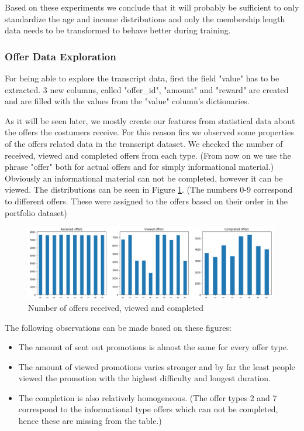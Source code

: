 Based on these experiments we conclude that it will probably be sufficient to only standardize the age and income distributions and only the membership length data needs to be transformed to behave better during training.

\subsubsection{Offer Data Exploration}

For being able to explore the transcript data, first the field "value" has to be extracted. 3 new columns, called "offer\_id", "amount" and "reward" are created and are filled with the values from the "value" column's dictionaries. 

As it will be seen later, we mostly create our features from statistical data about the offers the costumers receive. For this reason firs we observed some properties of the offers related data in the transcript dataset. We checked the number of received, viewed and completed offers from each type. (From now on we use the phrase "offer" both for actual offers and for simply informational material.) Obviously an informational material can not be completed, however it can be viewed. The distributions can be seen in Figure \ref{fig5}. (The numbers 0-9 correspond to different offers. These were assigned to the offers based on their order in the portfolio dataset)

\begin{figure}[h]
	\centering
	\includegraphics[width=0.99\textwidth]{fig/offer_distributions_1.jpg}
	\vspace*{-0.1in}
	\caption{Number of offers received, viewed and completed}
	\label{fig5}
	\vspace*{-0.2in}
	\bigskip
\end{figure}

The following observations can be made based on these figures:
\begin{itemize}
	\item The amount of sent out promotions is almost the same for every offer type.
	\item The amount of viewed promotions varies stronger and by far the least people viewed the promotion with the highest difficulty and longest duration.
	\item The completion is also relatively homogeneous. (The offer types 2 and 7 correspond to the informational type offers which can not be completed, hence these are missing from the table.)
\end{itemize}

